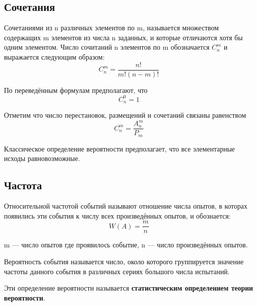 \documentclass[a5paper]{article}
\begin{document}
	\subsection{Сочетания}
	Сочетаниями из n различных элементов по m, называется множеством содержащих m элементов из числа n заданных, и которые отличаются хотя бы одним элементом. Число сочитаний n элементов по m обозначается $ {C}^{m}_{n} $ и выражается следующим образом:
	\[
		{C}^{m}_{n} = \dfrac{n!}{m!(n-m)!}	
	\]  
	
	По переведённым формулам предполагают, что 
	\[
	{C}^{0}_{n} = 1
	\]  
	
	Отметим что число перестановок, размещений и сочетаний связаны равенством
	\[
		{C}^{m}_{n} = \dfrac{{A}^{m}_{n}}{{P}_{m}}
	\] 
	
	Классическое определение вероятности предполагает, что все элементарные исходы равновозможные.
	
	\subsection{Частота}
	Относительной частотой событий называют отношение числа опытов, в которах появились эти события к числу всех произведённых опытов, и обознается:
	\[
		W(A) = \dfrac{m}{n}
	\]
	
	m --- число опытов где проявилось событие, n --- число произведённых опытов.
	
	\begin{itshape}
		Вероятность события называется число, около которого группируется значение частоты данного события в различных сериях большого числа испытаний.
	\end{itshape}

	Эти определение вероятности называется \textbf{статистическим определением теории вероятности}.
\end{document}
